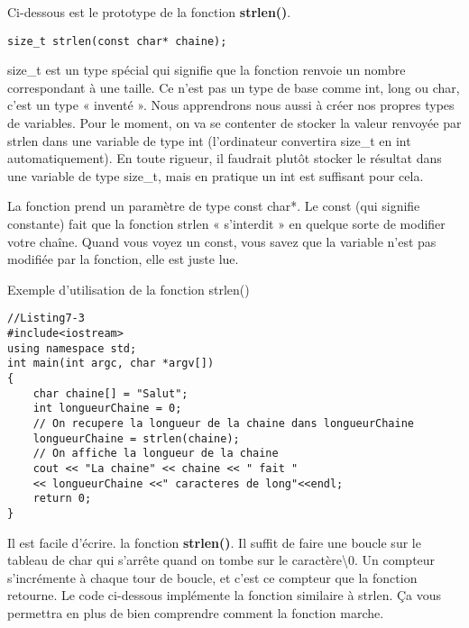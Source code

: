 \documentclass[a4paper, oneside,11pt]{book}
\begin{document}
Ci-dessous est le prototype de la fonction \textbf{strlen()}.


\begin{lstlisting}
size_t strlen(const char* chaine);
\end{lstlisting}


size\_t est un type sp\'ecial qui signifie que la fonction renvoie un nombre correspondant \`a une taille. Ce n'est pas un type de base comme int, long ou char, c'est un type 
« invent\'e ». Nous apprendrons nous aussi \`a cr\'eer nos propres types de variables.
Pour le moment, on va se contenter de stocker la valeur renvoy\'ee par strlen dans une variable de type int (l'ordinateur convertira 
 size\_t en int automatiquement). En toute rigueur, il faudrait plutôt stocker le r\'esultat dans une variable de type size\_t, mais en pratique un int est suffisant pour cela.



La fonction prend un param\`etre de type const char*. Le const (qui signifie constante) fait que la fonction strlen « s'interdit » 
en quelque sorte de modifier votre cha\^ine. Quand vous voyez un const, vous savez que la variable n'est pas modifi\'ee par la fonction, elle est juste lue.


Exemple d'utilisation de la fonction strlen()

\begin{lstlisting}
//Listing7-3
#include<iostream>
using namespace std;
int main(int argc, char *argv[])
{
    char chaine[] = "Salut";
    int longueurChaine = 0;
    // On recupere la longueur de la chaine dans longueurChaine
    longueurChaine = strlen(chaine);
    // On affiche la longueur de la chaine
    cout << "La chaine" << chaine << " fait "
    << longueurChaine <<" caracteres de long"<<endl;
    return 0;
}
\end{lstlisting}


Il est facile d'\'ecrire. la fonction \textbf{strlen()}.  Il suffit de faire une boucle sur le tableau de char qui s'arr\^ete quand on tombe sur le caract\`ere\textbackslash 0. 
Un compteur s'incr\'emente \`a chaque tour de boucle, et c'est ce compteur que la fonction retourne.
Le code ci-dessous impl\'emente la fonction similaire \`a strlen. Ça vous permettra en plus de bien comprendre comment la fonction marche.
\end{document}
